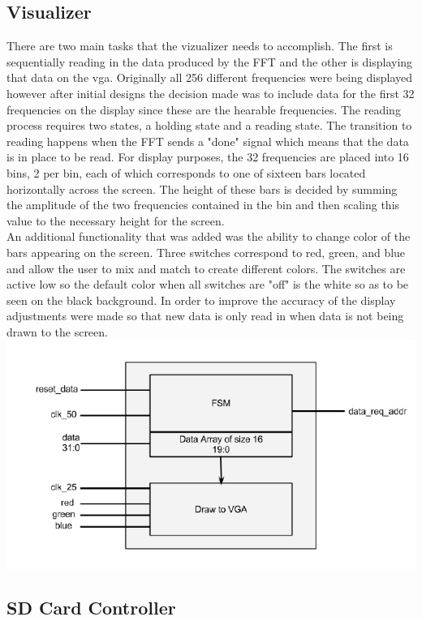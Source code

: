 \documentclass{article}
\begin{document}
\subsection{Visualizer} There are two main tasks that the vizualizer needs to accomplish.  The first is sequentially reading in the data produced by the FFT and the other is displaying that data on the vga.  Originally all 256 different frequencies were being displayed however after initial designs the decision made was to include data for the first 32 frequencies on the display since these are the hearable frequencies.  The reading process requires two states, a holding state and a reading state.  The transition to reading happens when the FFT sends a "done" signal which means that the data is in place to be read.  For display purposes, the 32 frequencies are placed into 16 bins, 2 per bin, each of which corresponds to one of sixteen bars located horizontally across the screen.  The height of these bars is decided by summing the amplitude of the two frequencies contained in the bin and then scaling this value to the necessary height for the screen.\\An additional functionality that was added was the ability to change color of the bars appearing on the screen.  Three switches correspond to red, green, and blue and allow the user to mix and match to create different colors.  The switches are active low so the default color when all switches are "off" is the white so as to be seen on the black background.  In order to improve the accuracy of the display adjustments were made so that new data is only read in when data is not being drawn to the screen.
  \includegraphics[width=20 cm]{viz_block_diagram.png}

\subsection{SD Card Controller}
\end{document}

